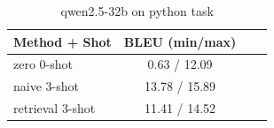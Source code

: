 \begin{table}[ht]
\centering
\small
\caption{qwen2.5-32b on python task}
\begin{tabular}{lccc}
\hline
Method + Shot & BLEU (min/max) \\
\hline
zero 0-shot & 0.63 / 12.09 \\
naive 3-shot & 13.78 / 15.89 \\
retrieval 3-shot & 11.41 / 14.52 \\
\hline
\end{tabular}
\end{table}
